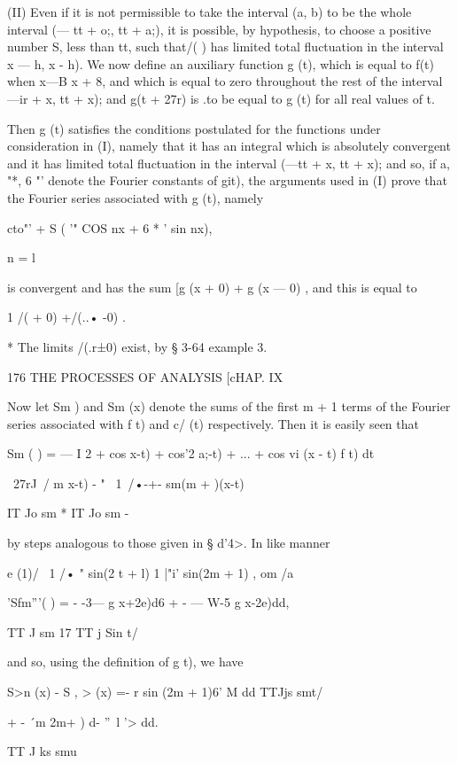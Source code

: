 (II) Even if it is not permissible to take the interval (a, b) to be
the whole interval (— tt + o;, tt + a;), it is possible, by
hypothesis, to choose a positive number S, less than tt, such that/( )
has limited total fluctuation in the interval x — h, x - h). We now
define an auxiliary function g (t), which is equal to f(t) when x—B%
x + 8, and which is equal to zero throughout the rest of the interval
—ir + x, tt + x); and g(t + 27r) is .to be equal to g (t) for all real
values of t.

Then g (t) satisfies the conditions postulated for the functions under
consideration in (I), namely that it has an integral which is
absolutely convergent and it has limited total fluctuation in the
interval (—tt + x, tt + x); and so, if a, "*, 6 "' denote the Fourier
constants of git), the arguments used in (I) prove that the Fourier
series associated with g (t), namely

  cto"' + S ( '" COS nx + 6 * ' sin nx),

n = l

is convergent and has the sum [g (x + 0) + g (x — 0) , and this is
equal to

1 /( + 0) +/(..• -0) .

* The limits /(.r±0) exist, by § 3-64 example 3.



176 THE PROCESSES OF ANALYSIS [cHAP. IX

Now let Sm ) and Sm (x) denote the sums of the first m + 1 terms of
the Fourier series associated with f t) and c/ (t) respectively. Then
it is easily seen that

Sm ( ) = — I 2 + cos x-t) + cos'2 a;-t) + ... + cos vi (x - t) f t) dt

~27rJ\ / m x-t) - " \ 1\ /•-+- sm(m + )(x-t)

IT Jo sm * IT Jo sm -

by steps analogous to those given in § d'4>. In like manner

e (1)/ \ 1 /• " sin(2 t + l) 1 |"i' sin(2m + 1) , om /a

'Sfm'''( ) = - -3— g x+2e)d6 + - — W-5 g x-2e)dd,

TT J sm 17 TT j Sin t/

and so, using the definition of g t), we have

S>n (x) - S , > (x) =- r sin (2m + 1)6' M dd TTJjs smt/

+ - \'\ m 2m+ ) d- ''~l '> dd.

TT J ks smu



